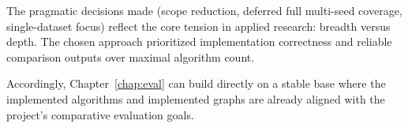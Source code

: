 The pragmatic decisions made (scope reduction, deferred full multi-seed coverage, single-dataset focus) reflect the core tension in applied research: breadth versus depth. The chosen approach prioritized implementation correctness and reliable comparison outputs over maximal algorithm count.

Accordingly, Chapter~\ref{chap:eval} can build directly on a stable base where the implemented algorithms and implemented graphs are already aligned with the project's comparative evaluation goals.
